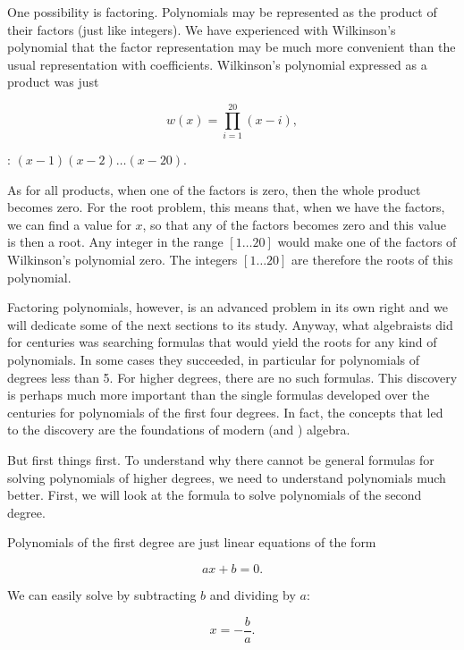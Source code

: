 \documentclass[tikz]{scrreprt}
\begin{document}
One possibility is factoring.
Polynomials may be represented as the product
of their factors (just like integers).
We have experienced with Wilkinson's polynomial
that the factor representation may be much more
convenient than the usual representation with
coefficients. Wilkinson's polynomial expressed
as a product was just

\begin{equation}
w(x) = \prod_{i=1}^{20}{(x-i)},
\end{equation}

\ie: $(x-1)(x-2)\dots (x-20)$.

As for all products, when one of the factors
is zero, then the whole product becomes zero.
For the root problem, this means that, 
when we have the factors, we can find a value
for $x$, so that any of the factors becomes zero
and this value is then a root.
Any integer in the range $[1\dots 20]$ would make
one of the factors of Wilkinson's polynomial zero.
The integers $[1\dots 20]$ are therefore the roots
of this polynomial.

Factoring polynomials, however, is an advanced
problem in its own right and we will dedicate
some of the next sections to its study. Anyway, what
algebraists did for centuries was searching
formulas that would yield the roots for any kind
of polynomials. In some cases they succeeded,
in particular for polynomials of degrees less
than 5. For higher degrees, there are no such
formulas. This discovery is perhaps much more
important than the single formulas developed
over the centuries for polynomials of the first
four degrees. In fact, the concepts that led
to the discovery are the foundations of modern
(and ) algebra. 

But first things first. To understand why there
cannot be general formulas for solving polynomials
of higher degrees, we need to understand polynomials
much better. First, we will look at the formula
to solve polynomials of the second degree.

Polynomials of the first degree are just 
linear equations of the form

\begin{equation}
ax + b = 0.
\end{equation}

We can easily solve by subtracting $b$ and dividing
by $a$:

\begin{equation}
x = -\frac{b}{a}.
\end{equation}
\end{document}

